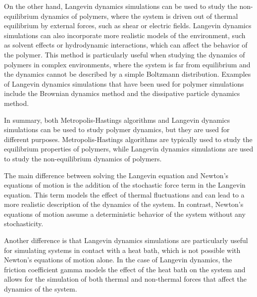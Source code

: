 \documentclass{ucetd}
\begin{document}
On the other hand, Langevin dynamics simulations can be used to study the non-equilibrium dynamics of polymers, where the system is driven out of thermal equilibrium by external forces, such as shear or electric fields. Langevin dynamics simulations can also incorporate more realistic models of the environment, such as solvent effects or hydrodynamic interactions, which can affect the behavior of the polymer. This method is particularly useful when studying the dynamics of polymers in complex environments, where the system is far from equilibrium and the dynamics cannot be described by a simple Boltzmann distribution. Examples of Langevin dynamics simulations that have been used for polymer simulations include the Brownian dynamics method and the dissipative particle dynamics method.

In summary, both Metropolis-Hastings algorithms and Langevin dynamics simulations can be used to study polymer dynamics, but they are used for different purposes. Metropolis-Hastings algorithms are typically used to study the equilibrium properties of polymers, while Langevin dynamics simulations are used to study the non-equilibrium dynamics of polymers.


The main difference between solving the Langevin equation and Newton's equations of motion is the addition of the stochastic force term in the Langevin equation. This term models the effect of thermal fluctuations and can lead to a more realistic description of the dynamics of the system. In contrast, Newton's equations of motion assume a deterministic behavior of the system without any stochasticity.

Another difference is that Langevin dynamics simulations are particularly useful for simulating systems in contact with a heat bath, which is not possible with Newton's equations of motion alone. In the case of Langevin dynamics, the friction coefficient gamma models the effect of the heat bath on the system and allows for the simulation of both thermal and non-thermal forces that affect the dynamics of the system.
\end{document}

